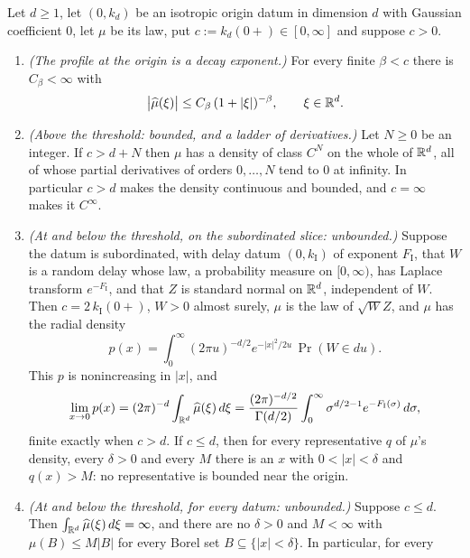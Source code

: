 \begin{theorem}\label{thm:origin-boundedness-d}
Let $d \ge 1$, let $(0, k_d)$ be an isotropic origin datum in dimension $d$ with Gaussian
coefficient $0$, let $\mu$ be its law, put $c := k_d(0{+}) \in [0,\infty]$ and suppose $c > 0$.
\begin{enumerate}
\item \emph{(The profile at the origin is a decay exponent.)} For every finite $\beta < c$ there
is $C_\beta < \infty$ with
\[
  \bigl|\widehat\mu(\xi)\bigr| \le C_\beta\,(1+|\xi|)^{-\beta}, \qquad \xi \in \mathbb{R}^d .
\]
\item \emph{(Above the threshold: bounded, and a ladder of derivatives.)} Let $N \ge 0$ be an
integer. If $c > d + N$ then $\mu$ has a density of class $C^N$ on the whole of $\mathbb{R}^d$, all of
whose partial derivatives of orders $0,\dots,N$ tend to $0$ at infinity. In particular $c > d$
makes the density continuous and bounded, and $c = \infty$ makes it $C^\infty$.
\item \emph{(At and below the threshold, on the subordinated slice: unbounded.)} Suppose the
datum is subordinated, with delay datum $(0,k_{\mathrm I})$ of exponent $F_{\mathrm I}$, that $W$
is a random delay whose law, a probability measure on $[0,\infty)$, has Laplace transform
$e^{-F_{\mathrm I}}$, and that $Z$ is standard normal on $\mathbb{R}^d$, independent of $W$. Then
$c = 2\,k_{\mathrm I}(0{+})$, $W > 0$ almost surely, $\mu$ is the law of $\sqrt{W}Z$, and $\mu$
has the radial density
\begin{equation}\label{eq:mixture-density}
  p(x) = \int_0^\infty (2\pi u)^{-d/2}e^{-|x|^2/2u}\,\Pr(W \in du) .
\end{equation}
This $p$ is nonincreasing in $|x|$, and
\[
  \lim_{x \to 0} p(x) = (2\pi)^{-d}\int_{\mathbb{R}^d}\widehat\mu(\xi)\,d\xi
   = \frac{(2\pi)^{-d/2}}{\Gamma(d/2)}\int_0^\infty \sigma^{d/2-1}e^{-F_{\mathrm I}(\sigma)}\,d\sigma ,
\]
finite exactly when $c > d$. If $c \le d$, then for every representative $q$ of $\mu$'s
density, every $\delta > 0$ and every $M$ there is an $x$ with $0 < |x| < \delta$ and
$q(x) > M$: no representative is bounded near the origin.
\item \emph{(At and below the threshold, for every datum: unbounded.)} Suppose $c \le d$. Then
$\int_{\mathbb{R}^d}\widehat\mu(\xi)\,d\xi = \infty$, and there are no $\delta > 0$ and $M < \infty$ with
$\mu(B) \le M|B|$ for every Borel set $B \subseteq \{|x| < \delta\}$. In particular, for every

\end{enumerate}
\end{theorem}
